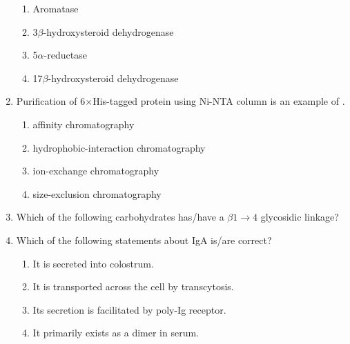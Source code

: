 \documentclass[journal,12pt,onecolumn]{IEEEtran}
\theoremstyle{remark}
\begin{document}
\begin{enumerate}
    \hfill{}
    \begin{enumerate}
        \item Aromatase
        \item 3$\beta$-hydroxysteroid dehydrogenase
        \item 5$\alpha$-reductase
        \item 17$\beta$-hydroxysteroid dehydrogenase
    \end{enumerate}

    \item Purification of 6$\times$His-tagged protein using Ni-NTA column is an example of \underline{\hspace{2cm}}.

    \hfill{}
    \begin{enumerate}
        \item affinity chromatography
        \item hydrophobic-interaction chromatography
        \item ion-exchange chromatography
        \item size-exclusion chromatography
    \end{enumerate}

    \item Which of the following carbohydrates has/have a $\beta1 \rightarrow 4$ glycosidic linkage?

    \hfill{}
    \begin{enumerate}
    \end{enumerate}

    \item Which of the following statements about IgA is/are correct?

    \hfill{}
    \begin{enumerate}
        \item It is secreted into colostrum.
        \item It is transported across the cell by transcytosis.
        \item Its secretion is facilitated by poly-Ig receptor.
        \item It primarily exists as a dimer in serum.
    \end{enumerate}


\end{enumerate}
\end{document}
